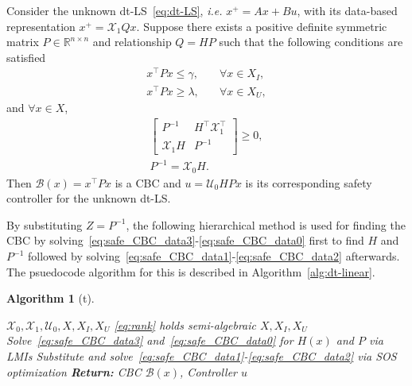 \documentclass[sigconf]{acmart}
\newtheorem{algorithm}{Algorithm}
\begin{document}
\begin{theorem}
\label{thm:data-dtLS-CBC}
Consider the unknown dt-LS~\eqref{eq:dt-LS}, \emph{i.e.} $x^+ = Ax+Bu$, with its data-based representation $x^+=\mathcal{X}_{1}Qx$.
Suppose there exists a positive definite symmetric matrix $P\in\mathbb{R}^{n\times n}$ and relationship $Q=HP$ such that the following conditions are satisfied
\begin{align}
\label{eq:safe_CBC_data1}
x^\top Px \leq \gamma, &\quad\forall x\in X_I, \\
\label{eq:safe_CBC_data2}
x^\top Px \geq \lambda, &\quad\forall x\in X_U,
\end{align}
and $\forall x\in X$,
\begin{align}
\label{eq:safe_CBC_data3}
\begin{bmatrix}
P^{-1}           & H^\top\mathcal{X}_{1}^\top \\
\mathcal{X}_{1}H & P^{-1}
\end{bmatrix} \geq 0, \\
\label{eq:safe_CBC_data0}
P^{-1} = \mathcal{X}_{0}H.
\end{align}
Then $\mathcal{B}(x) = x^\top Px$ is a CBC and  $u = \mathcal{U}_{0}HPx$ is its corresponding safety controller for the unknown dt-LS.
\end{theorem}

By substituting $Z=P^{-1}$, the following hierarchical method is used for finding the CBC by solving~\eqref{eq:safe_CBC_data3}-\eqref{eq:safe_CBC_data0} first to find $H$ and $P^{-1}$ followed by solving~\eqref{eq:safe_CBC_data1}-\eqref{eq:safe_CBC_data2} afterwards. The psuedocode algorithm for this is described in Algorithm~\ref{alg:dt-linear}.

\begin{algorithm}[t]
\caption{Hierarchy for dt-NPS CBCs}\label{alg:dt-linear}
\begin{algorithmic}[1]
\Require $\mathcal{X}_0,\mathcal{X}_1,\mathcal{U}_0,X,X_I,X_U$
\Ensure \eqref{eq:rank} holds
\Ensure semi-algebraic $X,X_I,X_U$
\State Solve~\eqref{eq:safe_CBC_data3} and~\eqref{eq:safe_CBC_data0} for $H(x)$ and $P$ via LMIs
\State Substitute and solve~\eqref{eq:safe_CBC_data1}-\eqref{eq:safe_CBC_data2} via SOS optimization
\noindent\Statex\textbf{Return:} CBC $\mathcal{B}(x)$, Controller $u$
\end{algorithmic}
\end{algorithm}
\end{document}
